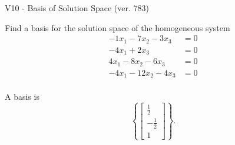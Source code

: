 \begin{exercise}
  \begin{exerciseTitle}V10 - Basis of Solution Space (ver. 783)\end{exerciseTitle}
  \begin{exerciseStatement}
    Find a basis for the solution space of the homogeneous system 
\begin{align*}
 -1 x_ 1 -7 x_ 2 -3 x_ 3 &= 0  \\ 
  -4 x_ 1 + 2 x_ 3 &= 0  \\ 
  4 x_ 1 -8 x_ 2 -6 x_ 3 &= 0  \\ 
  -4 x_ 1 -12 x_ 2 -4 x_ 3 &= 0  \\ 
 \end{align*}


 
  \end{exerciseStatement}

  \begin{exerciseAnswer}
   A basis is   
\[\left\{\left[\begin{array}{c}
\frac{1}{2} \\
-\frac{1}{2} \\
1
\end{array}\right]\right\}.\]

  


  \end{exerciseAnswer}
\end{exercise}